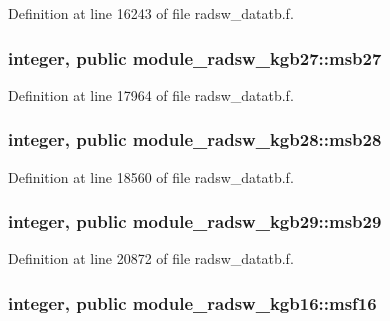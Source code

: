 Definition at line 16243 of file radsw\+\_\+datatb.\+f.

\subsubsection[{\texorpdfstring{msb27}{msb27}}]{\setlength{\rightskip}{0pt plus 5cm}integer, public module\+\_\+radsw\+\_\+kgb27\+::msb27}\hypertarget{group__module__radsw__main_ga3b2e57a0d4596aead5cad5aaca74850d}{}\label{group__module__radsw__main_ga3b2e57a0d4596aead5cad5aaca74850d}


Definition at line 17964 of file radsw\+\_\+datatb.\+f.

\subsubsection[{\texorpdfstring{msb28}{msb28}}]{\setlength{\rightskip}{0pt plus 5cm}integer, public module\+\_\+radsw\+\_\+kgb28\+::msb28}\hypertarget{group__module__radsw__main_ga55d73e39264b431135c6a9c809e20a94}{}\label{group__module__radsw__main_ga55d73e39264b431135c6a9c809e20a94}


Definition at line 18560 of file radsw\+\_\+datatb.\+f.

\subsubsection[{\texorpdfstring{msb29}{msb29}}]{\setlength{\rightskip}{0pt plus 5cm}integer, public module\+\_\+radsw\+\_\+kgb29\+::msb29}\hypertarget{group__module__radsw__main_gadd8e18a273d5fa133f22fb47c4d722da}{}\label{group__module__radsw__main_gadd8e18a273d5fa133f22fb47c4d722da}


Definition at line 20872 of file radsw\+\_\+datatb.\+f.

\subsubsection[{\texorpdfstring{msf16}{msf16}}]{\setlength{\rightskip}{0pt plus 5cm}integer, public module\+\_\+radsw\+\_\+kgb16\+::msf16}\hypertarget{group__module__radsw__main_gab35df3f7d231e98fbef5738119138907}{}\label{group__module__radsw__main_gab35df3f7d231e98fbef5738119138907}


